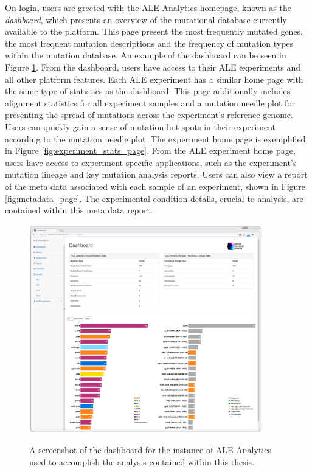 \documentclass[12pt,final,masters,chapterheads]{ucsd}  %
\begin{document}
% 
% 

On login, users are greeted with the ALE Analytics homepage, known as the \textit{dashboard}, which presents an overview of the mutational database currently available to the platform. This page present the most frequently mutated genes, the most frequent mutation descriptions and the frequency of mutation types within the mutation database. An example of the dashboard can be seen in Figure \ref{fig:dashboard_page}. From the dashboard, users have access to their ALE experiments and all other platform features. Each ALE experiment has a similar home page with the same type of statistics as the dashboard. This page additionally includes alignment statistics for all experiment samples and a mutation needle plot \cite{michael_p_schroeder_2015_14561} for presenting the spread of mutations across the experiment's reference genome. Users can quickly gain a sense of mutation hot-spots in their experiment according to the mutation needle plot. The experiment home page is exemplified in Figure \ref{fig:experiment_stats_page}. From the ALE experiment home page, users have access to experiment specific applications, such as the experiment's mutation lineage and key mutation analysis reports. Users can also view a report of the meta data associated with each sample of an experiment, shown in Figure \ref{fig:metadata_page}. The experimental condition details, crucial to analysis, are contained within this meta data report.
\begin{figure}[H]
  \caption{A screenshot of the dashboard for the instance of ALE Analytics used to accomplish the analysis contained within this thesis.}
  \centering
  \includegraphics[width=0.9\textwidth]{dashboard_page.png}
  \label{fig:dashboard_page}
\end{figure}
\end{document}
